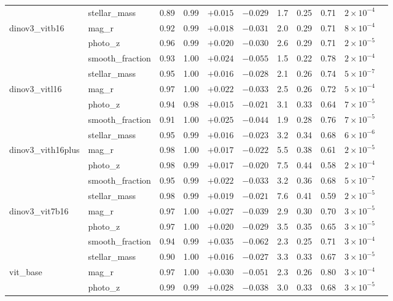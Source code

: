 \begin{table}[t]
\begin{tabular}{llccccccccc}
 & stellar\_mass & 0.89 & 0.99 & $+0.015$ & $-0.029$ & 1.7 & 0.25 & 0.71 & $2\times 10^{-4}$ \\
\addlinespace[2pt]
dinov3\_vitb16 & mag\_r & 0.92 & 0.99 & $+0.018$ & $-0.031$ & 2.0 & 0.29 & 0.71 & $8\times 10^{-4}$ \\
 & photo\_z & 0.96 & 0.99 & $+0.020$ & $-0.030$ & 2.6 & 0.29 & 0.71 & $2\times 10^{-5}$ \\
 & smooth\_fraction & 0.93 & 1.00 & $+0.024$ & $-0.055$ & 1.5 & 0.22 & 0.78 & $2\times 10^{-4}$ \\
 & stellar\_mass & 0.95 & 1.00 & $+0.016$ & $-0.028$ & 2.1 & 0.26 & 0.74 & $5\times 10^{-7}$ \\
\addlinespace[2pt]
dinov3\_vitl16 & mag\_r & 0.97 & 1.00 & $+0.022$ & $-0.033$ & 2.5 & 0.26 & 0.72 & $5\times 10^{-4}$ \\
 & photo\_z & 0.94 & 0.98 & $+0.015$ & $-0.021$ & 3.1 & 0.33 & 0.64 & $7\times 10^{-5}$ \\
 & smooth\_fraction & 0.91 & 1.00 & $+0.025$ & $-0.044$ & 1.9 & 0.28 & 0.76 & $7\times 10^{-5}$ \\
 & stellar\_mass & 0.95 & 0.99 & $+0.016$ & $-0.023$ & 3.2 & 0.34 & 0.68 & $6\times 10^{-6}$ \\
\addlinespace[2pt]
dinov3\_vith16plus & mag\_r & 0.98 & 1.00 & $+0.017$ & $-0.022$ & 5.5 & 0.38 & 0.61 & $2\times 10^{-5}$ \\
 & photo\_z & 0.98 & 0.99 & $+0.017$ & $-0.020$ & 7.5 & 0.44 & 0.58 & $2\times 10^{-4}$ \\
 & smooth\_fraction & 0.95 & 0.99 & $+0.022$ & $-0.033$ & 3.2 & 0.36 & 0.68 & $5\times 10^{-7}$ \\
 & stellar\_mass & 0.98 & 0.99 & $+0.019$ & $-0.021$ & 7.6 & 0.41 & 0.59 & $2\times 10^{-5}$ \\
\addlinespace[2pt]
dinov3\_vit7b16 & mag\_r & 0.97 & 1.00 & $+0.027$ & $-0.039$ & 2.9 & 0.30 & 0.70 & $3\times 10^{-5}$ \\
 & photo\_z & 0.97 & 1.00 & $+0.020$ & $-0.029$ & 3.5 & 0.35 & 0.65 & $3\times 10^{-5}$ \\
 & smooth\_fraction & 0.94 & 0.99 & $+0.035$ & $-0.062$ & 2.3 & 0.25 & 0.71 & $3\times 10^{-4}$ \\
 & stellar\_mass & 0.90 & 1.00 & $+0.016$ & $-0.027$ & 3.3 & 0.33 & 0.67 & $3\times 10^{-5}$ \\
\addlinespace[2pt]
vit\_base & mag\_r & 0.97 & 1.00 & $+0.030$ & $-0.051$ & 2.3 & 0.26 & 0.80 & $3\times 10^{-4}$ \\
 & photo\_z & 0.99 & 0.99 & $+0.028$ & $-0.038$ & 3.0 & 0.33 & 0.68 & $3\times 10^{-5}$ \\

\end{tabular}
\end{table}
